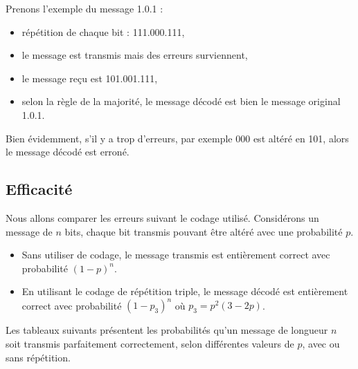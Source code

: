 \documentclass[11pt,class=report,crop=false]{standalone}
\begin{document}
Prenons l'exemple du message \og{}1.0.1\fg{} :
\begin{itemize}
  \item répétition de chaque bit : \og{}111.000.111\fg{},
  \item le message est transmis mais des erreurs surviennent,
  \item le message reçu est \og{}101.001.111\fg{},
  \item selon la règle de la majorité, le message décodé est bien le message original \og{}1.0.1\fg{}.
\end{itemize}

Bien évidemment, s'il y a trop d'erreurs, par exemple \og{}000\fg{} est altéré en \og{}101\fg{}, alors le message décodé est erroné. 


\subsection{Efficacité}

Nous allons comparer les erreurs suivant le codage utilisé.
Considérons un message de $n$ bits, chaque bit transmis pouvant être altéré avec une probabilité $p$.

\begin{proposition}
\label{prop:erreur}
\sauteligne
\begin{itemize}
  \item Sans utiliser de codage, le message transmis est entièrement correct avec probabilité $(1-p)^n$.
  \item En utilisant le codage de répétition triple, le message décodé est entièrement correct avec probabilité $(1-p_3)^n$ où $p_3 = p^2(3-2p)$.
\end{itemize}
\end{proposition}

Les tableaux suivants présentent les probabilités qu'un message de longueur $n$ soit transmis parfaitement correctement, selon différentes valeurs de $p$, avec ou sans répétition.
\end{document}
